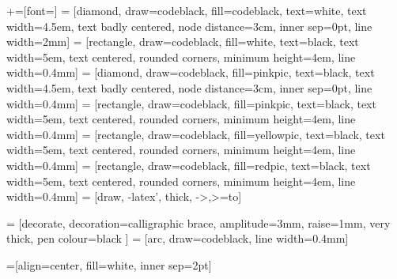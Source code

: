 +=[font=\footnotesize\sffamily]
\usetikzlibrary{calc, shapes, arrows, decorations.pathreplacing, calligraphy,
                calligraphy}
 = [diamond, draw=codeblack, fill=codeblack, text=white,
    text width=4.5em, text badly centered, node distance=3cm, inner sep=0pt,
    line width=2mm]
 = [rectangle, draw=codeblack, fill=white,  text=black,
    text width=5em, text centered, rounded corners, minimum height=4em,
    line width=0.4mm]
 = [diamond, draw=codeblack, fill=pinkpic, text=black,
    text width=4.5em, text badly centered, node distance=3cm, inner sep=0pt,
    line width=0.4mm]
 = [rectangle, draw=codeblack, fill=pinkpic,  text=black,
    text width=5em, text centered, rounded corners, minimum height=4em,
    line width=0.4mm]
 = [rectangle, draw=codeblack, fill=yellowpic,  text=black,
    text width=5em, text centered, rounded corners, minimum height=4em,
    line width=0.4mm]
 = [rectangle, draw=codeblack, fill=redpic,  text=black,
    text width=5em, text centered, rounded corners, minimum height=4em,
    line width=0.4mm]
 = [draw, -latex', thick, ->,>=to]

 =  [decorate,  %
                 decoration={calligraphic brace, amplitude=3mm, raise=1mm},
                 very thick, pen colour={black} ]
 = [arc, draw=codeblack, line width=0.4mm]

=[align=center, fill=white, inner sep=2pt]
